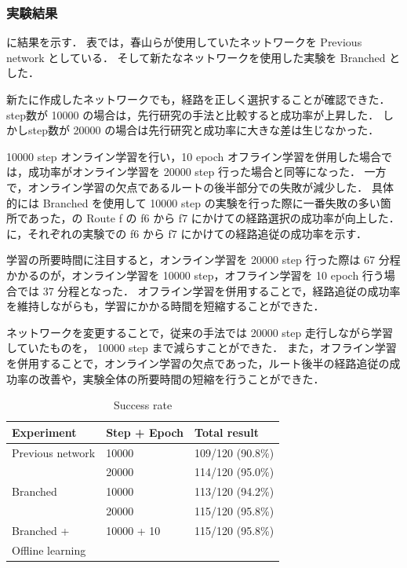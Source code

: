 \clearpage
\subsubsection{実験結果}
に結果を示す．
表では，春山らが使用していたネットワークを Previous network としている．
そして新たなネットワークを使用した実験を Branched とした．

新たに作成したネットワークでも，経路を正しく選択することが確認できた．
step数が 10000 の場合は，先行研究の手法と比較すると成功率が上昇した．
しかしstep数が 20000 の場合は先行研究と成功率に大きな差は生じなかった．

10000 step オンライン学習を行い，10 epoch オフライン学習を併用した場合では，成功率がオンライン学習を 20000 step 行った場合と同等になった．
一方で，オンライン学習の欠点であるルートの後半部分での失敗が減少した．
具体的には Branched を使用して 10000 step の実験を行った際に一番失敗の多い箇所であった，の Route f の f6 から f7 にかけての経路選択の成功率が向上した．
に，それぞれの実験での f6 から f7 にかけての経路追従の成功率を示す．

学習の所要時間に注目すると，オンライン学習を 20000 step 行った際は 67 分程かかるのが，オンライン学習を 10000 step，オフライン学習を 10 epoch 行う場合では 37 分程となった．
オフライン学習を併用することで，経路追従の成功率を維持しながらも，学習にかかる時間を短縮することができた．

ネットワークを変更することで，従来の手法では 20000 step 走行しながら学習していたものを， 10000 step まで減らすことができた．
また，オフライン学習を併用することで，オンライン学習の欠点であった，ルート後半の経路追従の成功率の改善や，実験全体の所要時間の短縮を行うことができた．


\begin{table}[]
  \centering
  \caption{Success rate}
  \begin{tabular}{lll}
  \hline
  Experiment        & Step + Epoch & Total result     \\ \hline
  Previous network  & 10000        & 109/120 (90.8\%) \\
                    & 20000        & 114/120 (95.0\%) \\ \hline
  Branched          & 10000        & 113/120 (94.2\%) \\ 
                    & 20000        & 115/120 (95.8\%) \\ \hline
  Branched +        & 10000 + 10   & 115/120 (95.8\%) \\ 
  Offline learning  &              &                  \\ \hline
  \end{tabular}
  \label{tab:result}
\end{table}

